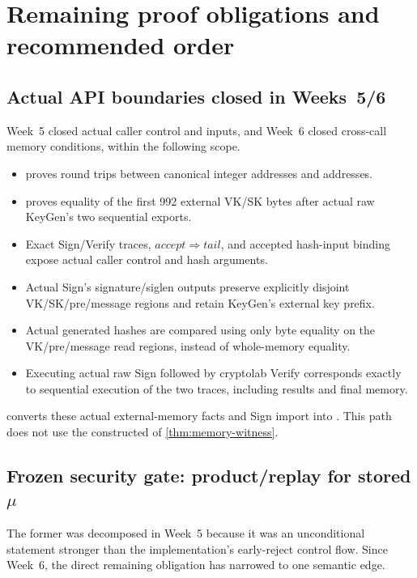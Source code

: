 \section{Remaining proof obligations and recommended order}
\label{sec:open-obligations}

\subsection{Actual API boundaries closed in Weeks~5/6}

Week~5 closed actual caller control and inputs, and Week~6 closed cross-call
memory conditions, within the following scope.

\begin{itemize}
  \item {} proves round trips between canonical
        integer addresses and  addresses.
  \item {} proves equality of
        the first 992 external VK/SK bytes after actual raw KeyGen's two sequential exports.
  \item Exact Sign/Verify traces, \(accept\Rightarrow tail\), and accepted hash-input
        binding expose actual caller control and hash arguments.
  \item Actual Sign's signature/siglen outputs preserve explicitly disjoint
        VK/SK/pre/message regions and retain KeyGen's external key prefix.
  \item Actual generated hashes are compared using only byte equality on the
        VK/pre/message read regions, instead of whole-memory equality.
  \item Executing actual raw Sign followed by cryptolab Verify corresponds exactly
        to sequential execution of the two traces, including results and final memory.
\end{itemize}

 converts these actual
external-memory facts and Sign import into . This
path does not use the constructed  of \cref{thm:memory-witness}.

\subsection{Frozen security gate: product/replay for stored \texorpdfstring{\(\mu\)}{mu}}

The former  was decomposed in Week~5 because it was
an unconditional statement stronger than the implementation's early-reject
control flow. Since Week~6, the direct remaining obligation has narrowed to one
semantic edge.

